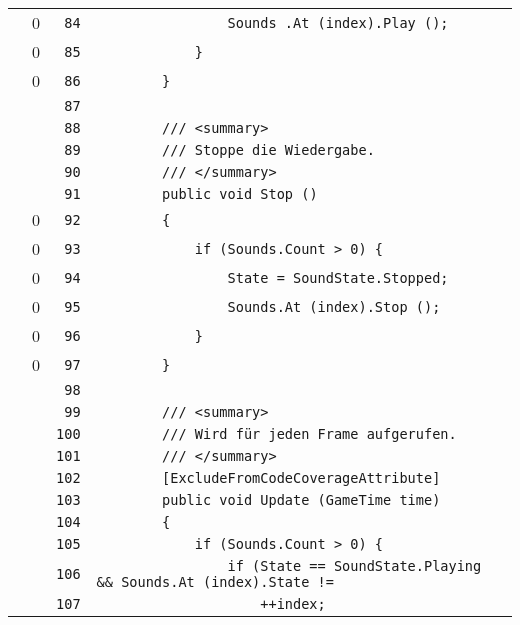\documentclass[a4paper,10pt]{article}
\begin{document}
\begin{longtable}[l]{lrrl}
\cellcolor{red} & 0 & \verb~84~ & \verb~                Sounds .At (index).Play ();~\\
\cellcolor{red} & 0 & \verb~85~ & \verb~            }~\\
\cellcolor{red} & 0 & \verb~86~ & \verb~        }~\\
\cellcolor{gray} &  & \verb~87~ & \verb~~\\
\cellcolor{gray} &  & \verb~88~ & \verb~        /// <summary>~\\
\cellcolor{gray} &  & \verb~89~ & \verb~        /// Stoppe die Wiedergabe.~\\
\cellcolor{gray} &  & \verb~90~ & \verb~        /// </summary>~\\
\cellcolor{gray} &  & \verb~91~ & \verb~        public void Stop ()~\\
\cellcolor{red} & 0 & \verb~92~ & \verb~        {~\\
\cellcolor{red} & 0 & \verb~93~ & \verb~            if (Sounds.Count > 0) {~\\
\cellcolor{red} & 0 & \verb~94~ & \verb~                State = SoundState.Stopped;~\\
\cellcolor{red} & 0 & \verb~95~ & \verb~                Sounds.At (index).Stop ();~\\
\cellcolor{red} & 0 & \verb~96~ & \verb~            }~\\
\cellcolor{red} & 0 & \verb~97~ & \verb~        }~\\
\cellcolor{gray} &  & \verb~98~ & \verb~~\\
\cellcolor{gray} &  & \verb~99~ & \verb~        /// <summary>~\\
\cellcolor{gray} &  & \verb~100~ & \verb~        /// Wird für jeden Frame aufgerufen.~\\
\cellcolor{gray} &  & \verb~101~ & \verb~        /// </summary>~\\
\cellcolor{gray} &  & \verb~102~ & \verb~        [ExcludeFromCodeCoverageAttribute]~\\
\cellcolor{gray} &  & \verb~103~ & \verb~        public void Update (GameTime time)~\\
\cellcolor{gray} &  & \verb~104~ & \verb~        {~\\
\cellcolor{gray} &  & \verb~105~ & \verb~            if (Sounds.Count > 0) {~\\
\cellcolor{gray} &  & \verb~106~ & \verb~                if (State == SoundState.Playing && Sounds.At (index).State != ~\\
\cellcolor{gray} &  & \verb~107~ & \verb~                    ++index;~\\

\end{longtable}
\end{document}
